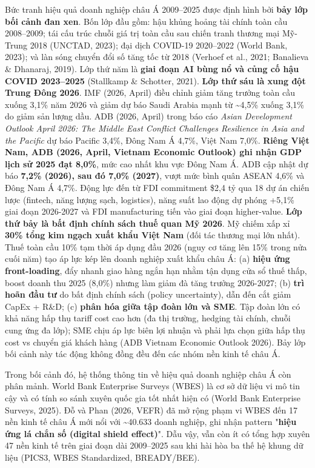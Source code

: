 \documentclass[12pt,a4paper]{article}
\begin{document}
Bức tranh hiệu quả doanh nghiệp châu Á 2009--2025 được định hình bởi
\textbf{bảy lớp bối cảnh đan xen}. Bốn lớp đầu gồm: hậu khủng hoảng tài
chính toàn cầu 2008--2009; tái cấu trúc chuỗi giá trị toàn cầu sau chiến
tranh thương mại Mỹ-Trung 2018 (UNCTAD, 2023); đại dịch COVID-19
2020--2022 (World Bank, 2023); và làn sóng chuyển đổi số tăng tốc từ
2018 (Verhoef et al., 2021; Banalieva \& Dhanaraj, 2019). Lớp thứ năm là
\textbf{giai đoạn AI bùng nổ và củng cố hậu COVID 2023--2025} (Stallkamp
\& Schotter, 2021). \textbf{Lớp thứ sáu là xung đột Trung Đông 2026}.
IMF (2026, April) điều chỉnh giảm tăng trưởng toàn cầu xuống 3,1\% năm
2026 và giảm dự báo Saudi Arabia mạnh từ \textasciitilde4,5\% xuống
3,1\% do giảm sản lượng dầu. ADB (2026, April) trong báo cáo \emph{Asian
Development Outlook April 2026: The Middle East Conflict Challenges
Resilience in Asia and the Pacific} dự báo Pacific 3,4\%, Đông Nam Á
4,7\%, Việt Nam 7,0\%. \textbf{Riêng Việt Nam, ADB (2026, April, Vietnam
Economic Outlook) ghi nhận GDP lịch sử 2025 đạt 8,0\%}, mức cao nhất khu
vực Đông Nam Á. ADB cập nhật dự báo \textbf{7,2\% (2026), sau đó 7,0\%
(2027)}, vượt mức bình quân ASEAN 4,6\% và Đông Nam Á 4,7\%. Động lực
đến từ FDI commitment \$2,4 tỷ qua 18 dự án chiến lược (fintech, năng
lượng sạch, logistics), năng suất lao động dự phóng +5,1\% giai đoạn
2026-2027 và FDI manufacturing tiến vào giai đoạn higher-value.
\textbf{Lớp thứ bảy là bất định chính sách thuế quan Mỹ 2026}. Mỹ chiếm
xấp xỉ \textbf{30\% tổng kim ngạch xuất khẩu Việt Nam} (đối tác thương
mại lớn nhất). Thuế toàn cầu 10\% tạm thời áp dụng đầu 2026 (nguy cơ
tăng lên 15\% trong nửa cuối năm) tạo áp lực kép lên doanh nghiệp xuất
khẩu châu Á: (a) \textbf{hiệu ứng front-loading}, đẩy nhanh giao hàng
ngắn hạn nhằm tận dụng cửa sổ thuế thấp, boost doanh thu 2025 (8,0\%)
nhưng làm giảm đà tăng trưởng 2026-2027; (b) \textbf{trì hoãn đầu tư} do
bất định chính sách (policy uncertainty), dẫn đến cắt giảm CapEx + R\&D;
(c) \textbf{phân hóa giữa tập đoàn lớn và SME}. Tập đoàn lớn có khả năng
hấp thụ tariff cost cao hơn (đa thị trường, hedging tài chính, chuỗi
cung ứng đa lớp); SME chịu áp lực biên lợi nhuận và phải lựa chọn giữa
hấp thụ cost vs chuyển giá khách hàng (ADB Vietnam Economic Outlook
2026). Bảy lớp bối cảnh này tác động không đồng đều đến các nhóm nền
kinh tế châu Á.

Trong bối cảnh đó, hệ thống thông tin về hiệu quả doanh nghiệp châu Á
còn phân mảnh. World Bank Enterprise Surveys (WBES) là cơ sở dữ liệu vi
mô tin cậy và có tính so sánh xuyên quốc gia tốt nhất hiện có (World
Bank Enterprise Surveys, 2025). Đỗ và Phan (2026, VEFR) đã mở rộng phạm
vi WBES đến 17 nền kinh tế châu Á mới nổi với \textasciitilde40.633
doanh nghiệp, ghi nhận pattern "\textbf{hiệu ứng lá chắn số (digital
shield effect)}". Dẫu vậy, vẫn còn ít có tổng hợp xuyên 47 nền kinh tế
trên giai đoạn dài 2009--2025 sau khi hài hòa ba thế hệ khung dữ liệu
(PICS3, WBES Standardized, BREADY/BEE).
\end{document}
